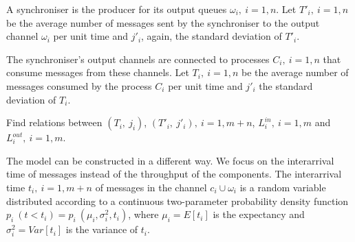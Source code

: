 A synchroniser is the producer for its output queues $\omega_{i}, \: i=1,n$. Let $T'_{i}, \: i=1,n$ be the average number of messages sent by the synchroniser to the output channel $\omega_{i}$ per unit time and $j'_{i}$, again, the standard deviation of $T'_{i}$.

The synchroniser's output channels are connected to processes $C_{i}, \: i=1,n$ that consume messages from these channels. Let $T_{i}, \: i=1,n$ be the average number of messages consumed by the process $C_{i}$ per unit time and $j'_{i}$ the standard deviation of $T_{i}$.

\begin{problem}Find relations between $(T_{i}, \: j_{i})$, $(T'_{i}, \: j'_{i}), \: i=1,m+n$, $L^{in}_{i}, \: i=1,m$ and $L^{out}_{i}, \: i=1,m$.
\end{problem}

The model can be constructed in a different way. We focus on the interarrival time of messages instead of the throughput of the components. The interarrival time $t_{i}, \: i=1,m+n$ of messages in the channel $c_{i} \cup \omega_{i}$ is a random variable distributed according to a continuous two-parameter probability density function $p_{i} \: (t < t_{i}) = p_{i} \: (\mu_{i}, \sigma^2_{i}, t_{i})$, where $\mu_{i} = E[t_{i}]$ is the expectancy and $\sigma^2_{i} = Var[t_{i}]$ is the variance of $t_{i}$.


